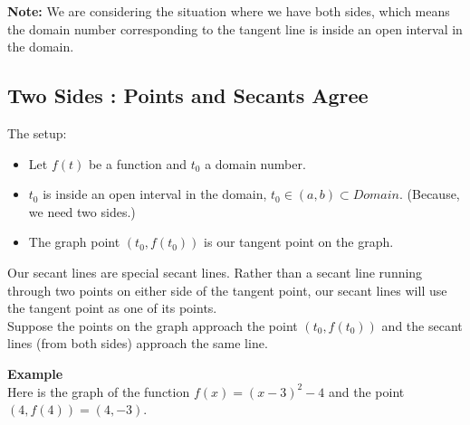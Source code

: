 \documentclass{ximera}
\begin{document}
\textbf{Note:} We are considering the situation where we have both sides, which means the domain number corresponding to the tangent line is inside an open interval in the domain. \\






















\subsection*{Two Sides : Points and Secants Agree}


The setup: \\

\begin{itemize}
     \item Let $f(t)$ be a function and $t_0$ a domain number. \\

     \item $t_0$ is inside an open interval in the domain, $t_0 \in (a, b) \subset Domain$. (Because, we need two sides.) \\

     \item The graph point $(t_0 , f(t_0))$ is our tangent point on the graph.
\end{itemize}


Our secant lines are special secant lines. Rather than a secant line running through two points on either side of the tangent point, our secant lines will use the tangent point as one of its points. \\ 



Suppose the points on the graph approach the point $(t_0 , f(t_0))$ and the secant lines (from both sides) approach the same line.



\textbf{\textcolor{blue!55!black}{Example}}  \\




Here is the graph of the function $f(x) = (x - 3)^2 - 4$ and the point $(4, f(4))= (4, -3)$. \\
\end{document}
